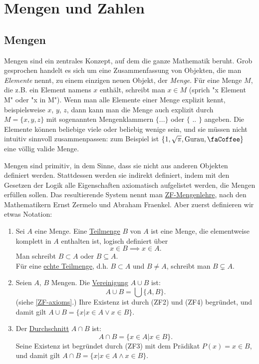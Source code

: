\chapter{Mengen und Zahlen}

\section{Mengen}

Mengen sind ein zentrales Konzept, auf dem die ganze Mathematik beruht. Grob gesprochen handelt es sich um eine Zusammenfassung von Objekten, die man \emph{Elemente} nennt, zu einem einzigen neuen Objekt, der \emph{Menge}. Für eine Menge $M$, die z.B. ein Element namens $x$ enthält, schreibt man $x \in M$ (sprich "x Element M" oder "x in M"). Wenn man alle Elemente einer Menge explizit kennt, beispielsweise $x$, $y$, $z$, dann kann man die Menge auch explizit durch $M = \{x, y, z\}$ mit sogenannten Mengenklammern $\{$...$\}$ oder $\{$ .. $\}$ angeben. Die Elemente können beliebige viele oder beliebig wenige sein, und sie müssen nicht intuitiv sinnvoll zusammenpassen: zum Beispiel ist $\{1, \sqrt{\pi}, \text{Gurau}, \text{\faCoffee} \}$ eine völlig valide Menge.

Mengen sind primitiv, in dem Sinne, dass sie nicht aus anderen Objekten definiert werden. Stattdessen werden sie indirekt definiert, indem mit den Gesetzen der Logik alle Eigenschaften axiomatisch aufgelistet werden, die Mengen erfüllen sollen. Das resultierende System nennt man \underline{ZF-Mengenlehre}, nach den Mathematikern Ernst Zermelo und Abraham Fraenkel. Aber zuerst definieren wir etwas Notation:

\begin{definition}
    \label{def-subset-union-cap}
    \begin{enumerate}
        \item Sei $A$ eine Menge. Eine \underline{Teilmenge} $B$ von $A$ ist eine Menge, die elementweise komplett in $A$ enthalten ist, logisch definiert über
        $$x \in B \implies x \in A.$$
        Man schreibt $B \subset A$ oder $B \subseteq A$.\\
        Für eine \underline{echte Teilmenge}, d.h. $B \subset A$ und $B \neq A$, schreibt man $B \subsetneq A$.
        \item Seien $A$, $B$ Mengen. Die \underline{Vereinigung} $A \cup B$ ist:
        $$A \cup B = \bigcup \{A, B\}.$$
        (siehe \ref{ZF-axioms}.) Ihre Existenz ist durch (ZF2) und (ZF4) begründet, und damit gilt $A \cup B = \{x | x \in A \lor x \in B\}$.
        \item Der \underline{Durchschnitt} $A \cap B$ ist:
        $$A \cap B = \{x \in A | x \in B\}.$$
        Seine Existenz ist begründet durch (ZF3) mit dem Prädikat $P(x) = x \in B$, und damit gilt $A \cap B = \{x | x \in A \land x \in B\}$.
    \end{enumerate}
\end{definition}

